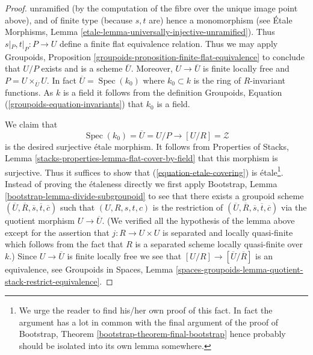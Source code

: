 \documentclass{stacks-project}
\theoremstyle{plain}
\theoremstyle{definition}
\theoremstyle{remark}
\numberwithin{equation}{subsection}
\def\Spec{\mathop{\mathrm{Spec}}}
\begin{document}
\begin{proof}
unramified (by the computation of the fibre over the unique image point
above), and of finite type (because $s, t$ are) hence a monomorphism (see
\'Etale Morphisms, Lemma
\ref{etale-lemma-universally-injective-unramified}).
Thus $s|_P, t|_P : P \to U$ define a finite flat equivalence
relation. Thus we may apply
Groupoids, Proposition \ref{groupoids-proposition-finite-flat-equivalence}
to conclude that $U/P$ exists and is a scheme $\overline{U}$.
Moreover, $U \to \overline{U}$ is finite locally free and
$P = U \times_{\overline{U}} U$.
In fact $\overline{U} = \Spec(k_0)$ where $k_0 \subset k$ is the
ring of $R$-invariant functions. As $k$ is a field it follows
from the definition
Groupoids, Equation (\ref{groupoids-equation-invariants})
that $k_0$ is a field.

\medskip\noindent
We claim that
\begin{equation}
\label{equation-etale-covering}
\Spec(k_0) = \overline{U} = U/P \to [U/R] = \mathcal{Z}
\end{equation}
is the desired surjective \'etale morphism. It follows from
Properties of Stacks, Lemma \ref{stacks-properties-lemma-flat-cover-by-field}
that this morphism is surjective. Thus it suffices to show that
(\ref{equation-etale-covering}) is \'etale\footnote{We urge the
reader to find his/her own proof of this fact. In fact the argument
has a lot in common with the final argument of the proof of
Bootstrap, Theorem \ref{bootstrap-theorem-final-bootstrap}
hence probably should be isolated into its own lemma somewhere.}.
Instead of proving the \'etaleness
directly we first apply
Bootstrap, Lemma \ref{bootstrap-lemma-divide-subgroupoid}
to see that there exists a groupoid scheme
$(\overline{U}, \overline{R}, \overline{s}, \overline{t}, \overline{c})$
such that $(U, R, s, t, c)$ is the restriction of
$(\overline{U}, \overline{R}, \overline{s}, \overline{t}, \overline{c})$
via the quotient morphism $U \to \overline{U}$.
(We verified all the hypothesis of the lemma above except for the assertion
that $j : R \to U \times U$ is separated and locally quasi-finite
which follows from the fact that $R$ is a separated scheme locally quasi-finite
over $k$.) Since $U \to \overline{U}$ is finite locally free
we see that $[U/R] \to [\overline{U}/\overline{R}]$ is an equivalence, see
Groupoids in Spaces,
Lemma \ref{spaces-groupoids-lemma-quotient-stack-restrict-equivalence}.


\end{proof}
\end{document}
